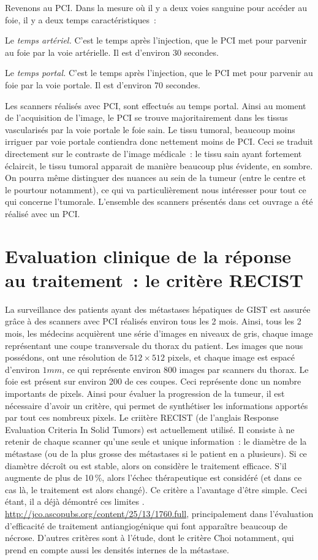 \documentclass[main.tex]{subfiles}
\begin{document}
Revenons au PCI. Dans la mesure où il y a deux voies sanguine pour accéder au foie, il y a deux temps caractéristiques~:
\begin{myitemize}
\item Le \emph{temps artériel.} C'est le temps après l'injection, que le PCI met pour parvenir au foie par la voie artérielle. Il est d'environ 30 secondes.
\item Le \emph{temps portal.} C'est le temps après l'injection, que le PCI met pour parvenir au foie par la voie portale. Il est d'environ 70 secondes. 
\end{myitemize}
Les scanners réalisés avec PCI, sont effectués au temps portal. Ainsi au moment de l'acquisition de l'image, le PCI se trouve majoritairement dans les tissus vascularisés par la voie portale \ie le foie sain. Le tissu tumoral, beaucoup moins irriguer par voie portale contiendra donc nettement moins de PCI. Ceci se traduit directement sur le contraste de l'image médicale~: le tissu sain ayant fortement éclaircit, le tissu tumoral apparait de manière beaucoup plus évidente, en sombre. On pourra même distinguer des nuances au sein de la tumeur (entre le centre et le pourtour notamment), ce qui va particulièrement nous intéresser pour tout ce qui concerne l'\hetero tumorale. L'ensemble des scanners présentés dans cet ouvrage a été réalisé avec un PCI.

\section{Evaluation clinique de la réponse au traitement~: le critère RECIST}
La surveillance des patients ayant des métastases hépatiques de GIST est assurée grâce à des scanners avec PCI réalisés environ tous les 2 mois. Ainsi, tous les 2 mois, les médecins acquièrent une série d'images en niveaux de gris, chaque image représentant une coupe transversale du thorax du patient. Les images que nous possédons, ont une résolution de $512\times512$ pixels, et chaque image est espacé d'environ $1mm$, ce qui représente environ 800 images par scanners du thorax. Le foie est présent sur environ 200 de ces coupes. Ceci représente donc un nombre importants de pixels. Ainsi pour évaluer la progression de la tumeur, il est nécessaire d'avoir un critère, qui permet de synthétiser les informations apportés par tout ces nombreux pixels. Le criitère RECIST (de l'anglais Response Evaluation Criteria In Solid Tumors) est actuellement utilisé. Il consiste à ne retenir de chaque scanner qu'une seule et unique information~: le diamètre de la métastase (ou de la plus grosse des métastases si le patient en a plusieurs). Si ce diamètre décroît ou est stable, alors on considère le traitement efficace. S'il augmente de plus de 10\,\%, alors l'échec thérapeutique est considéré (et dans ce cas là, le traitement est alors changé). Ce critère  a l'avantage d'être simple. Ceci étant, il a déjà démontré ces limites \cf. \url{http://jco.ascopubs.org/content/25/13/1760.full}, principalement dans l'évaluation d'efficacité de traitement antiangiogénique qui font apparaître beaucoup de nécrose. 
D'autres critères sont à l'étude, dont le critère Choi notamment, qui prend en compte aussi les densités internes de la métastase. 
\end{document}
